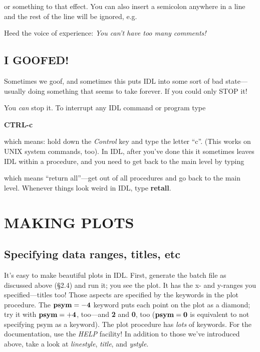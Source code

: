 \documentclass[psfig,preprint]{aastex}
\begin{document}


\noindent or something to that effect. You can also insert a semicolon
anywhere in a line and the rest of the line will be ignored, e.g.


\noindent Heed the voice of experience: {\it You can't have too many
comments!} 

\subsection {I GOOFED!}

	Sometimes we goof, and sometimes this puts IDL into some sort of
bad state---usually doing something that seems to take forever. If you
could only STOP it!

	You {\it can} stop it. To interrupt any IDL command or program
type

{\noindent} {\bf CTRL-c}

\noindent which means: hold down the {\it Control} key and type the
letter ``c''.  (This works on UNIX system commands, too).  In
IDL, after you've done this it sometimes leaves IDL within a procedure,
and you need to get back to the main level by typing


\noindent which means ``return all''---get out of all procedures and go
back to the main level. Whenever things look weird in IDL, type {\bf
retall}. 

\section {MAKING PLOTS}

\subsection {Specifying data ranges, titles, etc}

	It's easy to make beautiful plots in IDL.  First, generate the
batch file as discussed above (\S 2.4) and run it; you see the plot.  It
has the x- and y-ranges you specified---titles too! Those aspects are
specified by the keywords in the plot procedure.  The ${\bf psym=-4}$
keyword puts each point on the plot as a diamond; try it with ${\bf
psym=+4}$, too---and {\bf 2} and {\bf 0}, too (${\bf psym=0}$ is
equivalent to not specifying psym as a keyword).  The plot procedure has
{\it lots} of keywords.  For the documentation, use the {\it HELP}
facility! In addition to those we've introduced above, take a look at
{\it linestyle}, {\it title}, and {\it ystyle}. 
\end{document}
